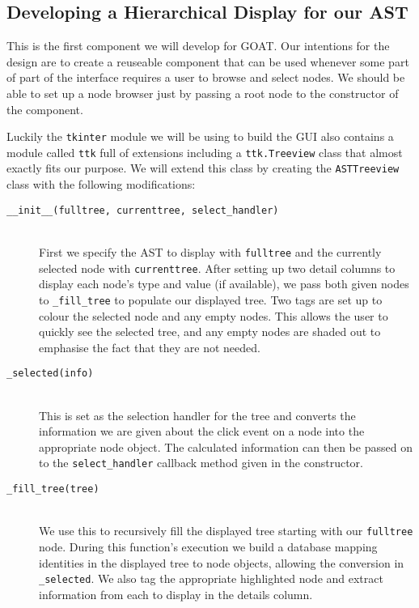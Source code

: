 \documentclass[twoside,a4paper]{report}
\begin{document}
\subsection{Developing a Hierarchical Display for our AST}

This is the first component we will develop for GOAT. Our intentions for the design are to create a reuseable component that can be used whenever some part of
part of the interface requires a user to browse and select nodes. We should be able to set up a node browser just by passing a root node to the
constructor of the component.

Luckily the \texttt{tkinter} module we will be using to build the GUI also contains a module called \texttt{ttk} full of extensions including a
\texttt{ttk.Treeview} class that almost exactly fits our purpose. We will extend this class by creating the \texttt{ASTTreeview} class with the
following modifications:

\begin{description}
\item[\texttt{\_\_init\_\_(fulltree, currenttree, select\_handler)}] \hfill \\
First we specify the AST to display with \texttt{fulltree} and the currently selected node with \texttt{currenttree}. After setting up two detail columns
to display each node's type and value (if available), we pass both given nodes to \texttt{\_fill\_tree} to populate our displayed tree. Two tags are set
up to colour the selected node and any empty nodes. This allows the user to quickly see the selected tree, and any empty nodes are shaded out to emphasise
the fact that they are not needed.

\item[\texttt{\_selected(info)}] \hfill \\
This is set as the selection handler for the tree and converts the information we are given about the click event on a node into the appropriate node object.
The calculated information can then be passed on to the \texttt{select\_handler} callback method given in the constructor.

\item[\texttt{\_fill\_tree(tree)}] \hfill \\
We use this to recursively fill the displayed tree starting with our \texttt{fulltree} node. During this function's execution we build a database mapping
identities in the displayed tree to node objects, allowing the conversion in \texttt{\_selected}. We also tag the appropriate highlighted node and extract
information from each to display in the details column.
\end{description}
\end{document}
